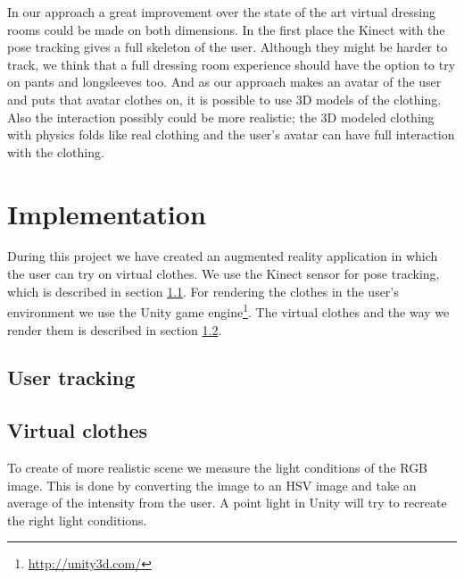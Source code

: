 \documentclass[a4paper]{article}
\begin{document}
In our approach a great improvement over the state of the art virtual dressing rooms could be made on both dimensions. In the first place the Kinect with the pose tracking gives a full skeleton of the user. Although they might be harder to track, we think that a full dressing room experience should have the option to try on pants and longsleeves too. And as our approach makes an avatar of the user and puts that avatar clothes on, it is possible to use 3D models of the clothing. Also the interaction possibly could be more realistic; the 3D modeled clothing with physics folds like real clothing and the user's avatar can have full interaction with the clothing.

\section{Implementation}
\label{sec:implementation}

During this project we have created an augmented reality application in which the user can try on virtual clothes. We use the Kinect sensor for pose tracking, which is described in section \ref{sec:user_tracking}. For rendering the clothes in the user's environment we use the Unity game engine\footnote{\url{http://unity3d.com/}}. The virtual clothes and the way we render them is described in section \ref{sec:virtual_clothes}.



\subsection{User tracking}
\label{sec:user_tracking}



\subsection{Virtual clothes}
\label{sec:virtual_clothes}



To create of more realistic scene we measure the light conditions of the RGB image. This is done by converting the image to an HSV image and take an average of the intensity from the user.
A point light in Unity will try to recreate the right light conditions.
\end{document}
